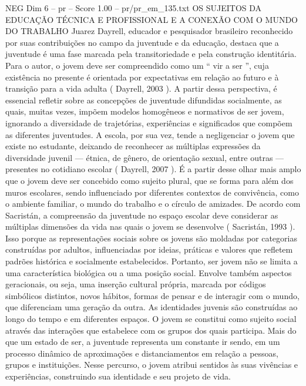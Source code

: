 \begin{textsample}{NEG Dim 6 – pr – Score 1.00 – pr/pr\_em\_135.txt}  \label{ex:f6_neg_265}
OS SUJEITOS DA EDUCAÇÃO TÉCNICA E PROFISSIONAL E A CONEXÃO COM O MUNDO DO TRABALHO Juarez Dayrell, educador e pesquisador brasileiro reconhecido por suas contribuições no campo da juventude e da educação, destaca que a juventude é uma fase marcada pela transitoriedade e pela construção identitária.
Para o autor, o jovem deve ser compreendido como um “ vir a ser ”, cuja existência no presente é orientada por expectativas em relação ao futuro e à transição para a vida adulta ( Dayrell, 2003 ).
A partir dessa perspectiva, é essencial refletir sobre as concepções de juventude difundidas socialmente, as quais, muitas vezes, impõem modelos homogêneos e normativos de ser jovem, ignorando a diversidade de trajetórias, experiências e significados que compõem as diferentes juventudes.
A escola, por sua vez, tende a negligenciar o jovem que existe no estudante, deixando de reconhecer as múltiplas expressões da diversidade juvenil — étnica, de gênero, de orientação sexual, entre outras — presentes no cotidiano escolar ( Dayrell, 2007 ).
É a partir desse olhar mais amplo que o jovem deve ser concebido como sujeito plural, que se forma para além dos muros escolares, sendo influenciado por diferentes contextos de convivência, como o ambiente familiar, o mundo do trabalho e o círculo de amizades.
De acordo com Sacristán, a compreensão da juventude no espaço escolar deve considerar as múltiplas dimensões da vida nas quais o jovem se desenvolve ( Sacristán, 1993 ).
Isso porque as representações sociais sobre os jovens são moldadas por categorias construídas por adultos, influenciadas por ideias, práticas e valores que refletem padrões histórica e socialmente estabelecidos.
Portanto, ser jovem não se limita a uma característica biológica ou a uma posição social.
Envolve também aspectos geracionais, ou seja, uma inserção cultural própria, marcada por códigos simbólicos distintos, novos hábitos, formas de pensar e de interagir com o mundo, que diferenciam uma geração da outra.
As identidades juvenis são construídas ao longo do tempo e em diferentes espaços.
O jovem se constitui como sujeito social através das interações que estabelece com os grupos dos quais participa.
Mais do que um estado de ser, a juventude representa um constante ir sendo, em um processo dinâmico de aproximações e distanciamentos em relação a pessoas, grupos e instituições.
Nesse percurso, o jovem atribui sentidos às suas vivências e experiências, construindo sua identidade e seu projeto de vida.

\end{textsample}
